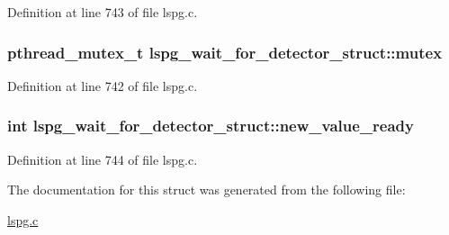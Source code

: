 Definition at line 743 of file lspg.\-c.

\hypertarget{structlspg__wait__for__detector__struct_a958e9fe59e671e61f95c2ce796ba24ce}{
\subsubsection[{mutex}]{\setlength{\rightskip}{0pt plus 5cm}pthread\-\_\-mutex\-\_\-t lspg\-\_\-wait\-\_\-for\-\_\-detector\-\_\-struct\-::mutex}}\label{structlspg__wait__for__detector__struct_a958e9fe59e671e61f95c2ce796ba24ce}


Definition at line 742 of file lspg.\-c.

\hypertarget{structlspg__wait__for__detector__struct_ad950e85c70c4473c5c7c40f8ceeae61d}{
\subsubsection[{new\-\_\-value\-\_\-ready}]{\setlength{\rightskip}{0pt plus 5cm}int lspg\-\_\-wait\-\_\-for\-\_\-detector\-\_\-struct\-::new\-\_\-value\-\_\-ready}}\label{structlspg__wait__for__detector__struct_ad950e85c70c4473c5c7c40f8ceeae61d}


Definition at line 744 of file lspg.\-c.



The documentation for this struct was generated from the following file\-:\begin{DoxyCompactItemize}
\item 
\hyperlink{lspg_8c}{lspg.\-c}\end{DoxyCompactItemize}
